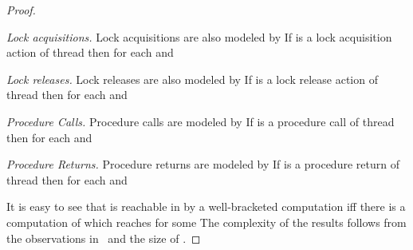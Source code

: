 \documentclass{LMCS}
\begin{document}
\begin{proof}
\begin{iteMize}{}
\begin{iteMize}{}
                  \item {\it Lock acquisitions.} Lock acquisitions are also modeled by  If  is a lock
                    acquisition action of thread 
                   then for each   and 
                  
                   \item {\it Lock releases.} Lock releases are also modeled by  If  is a lock
                    release action of thread 
                   then for each   and 
                  
                    \item {\it Procedure Calls.}     Procedure calls are modeled  by  If 
                    is a procedure call of thread  then for each
                     and 
                    

                   \item {\it Procedure Returns.}     Procedure returns are modeled  by  If 
                    is a procedure return of thread  then for each
                     and 
                    



                                  \end{iteMize}

\end{iteMize}

\noindent It is easy to see that  is reachable in  by a
well-bracketed computation iff there is a computation of 
which reaches  for some  The complexity of the results follows from the observations
in~\cite{bem97} and the size of . \end{proof}
\end{document}
